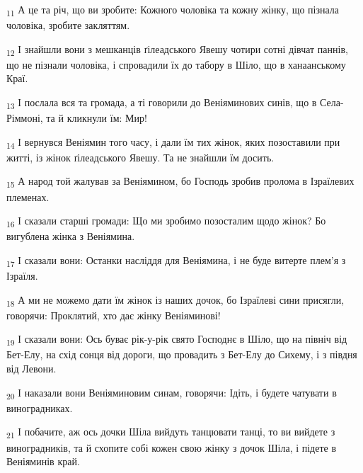 \begin{tcolorbox}
\textsubscript{11} А це та річ, що ви зробите: Кожного чоловіка та кожну жінку, що пізнала чоловіка, зробите закляттям.
\end{tcolorbox}
\begin{tcolorbox}
\textsubscript{12} І знайшли вони з мешканців ґілеадського Явешу чотири сотні дівчат паннів, що не пізнали чоловіка, і спровадили їх до табору в Шіло, що в ханаанському Краї.
\end{tcolorbox}
\begin{tcolorbox}
\textsubscript{13} І послала вся та громада, а ті говорили до Веніяминових синів, що в Села-Ріммоні, та й кликнули їм: Мир!
\end{tcolorbox}
\begin{tcolorbox}
\textsubscript{14} І вернувся Веніямин того часу, і дали їм тих жінок, яких позоставили при житті, із жінок ґілеадського Явешу. Та не знайшли їм досить.
\end{tcolorbox}
\begin{tcolorbox}
\textsubscript{15} А народ той жалував за Веніямином, бо Господь зробив пролома в Ізраїлевих племенах.
\end{tcolorbox}
\begin{tcolorbox}
\textsubscript{16} І сказали старші громади: Що ми зробимо позосталим щодо жінок? Бо вигублена жінка з Веніямина.
\end{tcolorbox}
\begin{tcolorbox}
\textsubscript{17} І сказали вони: Останки насліддя для Веніямина, і не буде витерте плем'я з Ізраїля.
\end{tcolorbox}
\begin{tcolorbox}
\textsubscript{18} А ми не можемо дати їм жінок із наших дочок, бо Ізраїлеві сини присягли, говорячи: Проклятий, хто дає жінку Веніяминові!
\end{tcolorbox}
\begin{tcolorbox}
\textsubscript{19} І сказали вони: Ось буває рік-у-рік свято Господнє в Шіло, що на північ від Бет-Елу, на схід сонця від дороги, що провадить з Бет-Елу до Сихему, і з півдня від Левони.
\end{tcolorbox}
\begin{tcolorbox}
\textsubscript{20} І наказали вони Веніяминовим синам, говорячи: Ідіть, і будете чатувати в виноградниках.
\end{tcolorbox}
\begin{tcolorbox}
\textsubscript{21} І побачите, аж ось дочки Шіла вийдуть танцювати танці, то ви вийдете з виноградників, та й схопите собі кожен свою жінку з дочок Шіла, і підете в Веніяминів край.
\end{tcolorbox}
